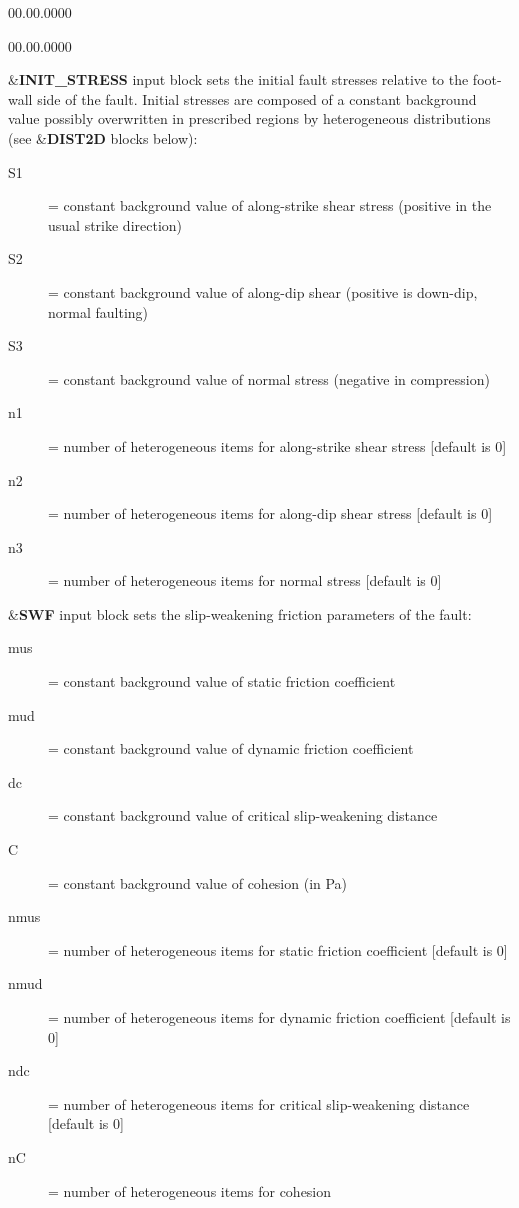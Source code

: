 \begin{lyxlist}{00.00.0000}
\begin{lyxlist}{00.00.0000}
\item [{\&\textbf{INIT\_STRESS}}] input block sets the initial fault stresses
relative to the foot-wall side of the fault. Initial stresses are
composed of a constant background value possibly overwritten in prescribed
regions by heterogeneous distributions (see \&\textbf{DIST2D} blocks
below):
\begin{description}
\item [{S1}] = constant background value of along-strike shear stress (positive
in the usual strike direction)
\item [{S2}] = constant background value of along-dip shear (positive is
down-dip, normal faulting)
\item [{S3}] = constant background value of normal stress (negative in
compression)
\item [{n1}] = number of heterogeneous items for along-strike shear stress
{[}default is 0{]}
\item [{n2}] = number of heterogeneous items for along-dip shear stress
{[}default is 0{]}
\item [{n3}] = number of heterogeneous items for normal stress {[}default
is 0{]}
\end{description}

\item [{\&\textbf{SWF}}] input block sets the slip-weakening friction parameters
of the fault:
\begin{description}
\item [{mus}] = constant background value of static friction coefficient
\item [{mud}] = constant background value of dynamic friction coefficient
\item [{dc}] = constant background value of critical slip-weakening distance
\item [{C}] = constant background value of cohesion (in Pa)
\item [{nmus}] = number of heterogeneous items for static friction coefficient
{[}default is 0{]}
\item [{nmud}] = number of heterogeneous items for dynamic friction coefficient
{[}default is 0{]}
\item [{ndc}] = number of heterogeneous items for critical slip-weakening
distance {[}default is 0{]}
\item [{nC}] = number of heterogeneous items for cohesion
\end{description}


\end{lyxlist}
\end{lyxlist}
